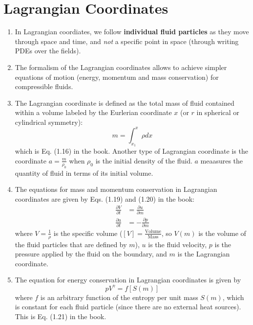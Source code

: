 ﻿\documentclass[11pt]{article}
\begin{document}
\section{Lagrangian Coordinates}
\begin{enumerate}
  \item In Lagrangian coordiates, we follow \textbf{individual fluid particles} as they move through space and time, and \textit{not} a specific point in space (through writing PDEs over the fields).
  \item The formalism of the Lagrangian coordinates allows to achieve simpler equations of motion (energy, momentum and mass conservation) for compressible fluids.
  \item The Lagrangian coordinate is defined as the total mass of fluid contained within a volume labeled by the Eurlerian coordinate $x$ (or $r$ in spherical or cylindrical symmetry):
  \begin{equation}
    m = \int_{x_1}^{x} \rho dx
  \end{equation}
  which is Eq. (1.16) in the book. Another type of Lagrangian coordinate is the coordinate $a=\frac{m}{\rho_0}$ when $\rho_0$ is the initial density of the fluid. $a$ meaasures the quantity of fluid in terms of its initial volume.
  \item The equations for mass and momentum conservation in Lagrangian coordinates are given by Eqs. (1.19) and (1.20) in the book:
  \begin{align}
    \frac{\partial V}{\partial t} &= \frac{\partial u}{\partial m} \\
    \frac{\partial u}{\partial t} &= -\frac{\partial p}{\partial m}
  \end{align}
  where $V=\frac{1}{\rho}$ is the specific volume ($[V]=\frac{\text{Volume}}{\text{Mass}}$, so $V(m)$ is the volume of the fluid particles that are defined by $m$), $u$ is the fluid velocity, $p$ is the pressure applied by the fluid on the boundary, and $m$ is the Lagrangian coordinate.
  \item The equation for energy conservation in Lagrangian coordinates is given by
  \begin{equation}
    pV^\gamma = f[S(m)]
  \end{equation}
  where $f$ is an arbitrary function of the entropy per unit mass $S(m)$, which is constant for each fluid particle (since there are no external heat sources). This is Eq. (1.21) in the book.
\end{enumerate}
\end{document}
